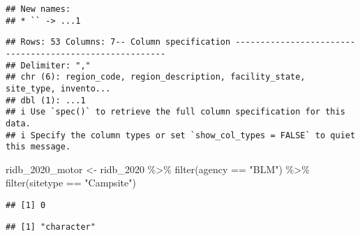 \documentclass[
]{article}
\newenvironment{Shaded}{\begin{snugshade}}{\end{snugshade}}
\newcommand{\FunctionTok}[1]{\textcolor[rgb]{0.00,0.00,0.00}{#1}}
\newcommand{\NormalTok}[1]{#1}
\newcommand{\OtherTok}[1]{\textcolor[rgb]{0.56,0.35,0.01}{#1}}
\newcommand{\SpecialCharTok}[1]{\textcolor[rgb]{0.00,0.00,0.00}{#1}}
\newcommand{\StringTok}[1]{\textcolor[rgb]{0.31,0.60,0.02}{#1}}
\begin{document}
\begin{verbatim}
## New names:
## * `` -> ...1
\end{verbatim}

\begin{verbatim}
## Rows: 53 Columns: 7-- Column specification --------------------------------------------------------
## Delimiter: ","
## chr (6): region_code, region_description, facility_state, site_type, invento...
## dbl (1): ...1
## i Use `spec()` to retrieve the full column specification for this data.
## i Specify the column types or set `show_col_types = FALSE` to quiet this message.
\end{verbatim}

\begin{Shaded}
\begin{Highlighting}[]
\NormalTok{ridb\_2020\_motor }\OtherTok{\textless{}{-}}\NormalTok{ ridb\_2020 }\SpecialCharTok{\%\textgreater{}\%} 
  \FunctionTok{filter}\NormalTok{(agency }\SpecialCharTok{==} \StringTok{"BLM"}\NormalTok{) }\SpecialCharTok{\%\textgreater{}\%} 
  \FunctionTok{filter}\NormalTok{(sitetype }\SpecialCharTok{==} \StringTok{"Campsite"}\NormalTok{)}
\end{Highlighting}
\end{Shaded}

\begin{Shaded}
\end{Shaded}

\begin{verbatim}
## [1] 0
\end{verbatim}

\begin{Shaded}
\end{Shaded}

\begin{verbatim}
## [1] "character"
\end{verbatim}

\begin{Shaded}
\end{Shaded}
\end{document}
